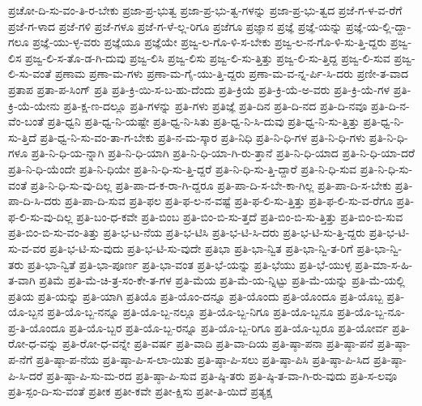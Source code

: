 {ಪ್ರಚೋ-ದಿ-ಸು-ವಂ-ತಿ-ರ-ಬೇಕು
ಪ್ರಜಾ-ಪ್ರ-ಭುತ್ವ
ಪ್ರಜಾ-ಪ್ರ-ಭು-ತ್ವ-ಗಳನ್ನು
ಪ್ರಜಾ-ಪ್ರ-ಭು-ತ್ವದ
ಪ್ರಜೆ-ಗ-ಳ-ವ-ರೆಗೆ
ಪ್ರಜೆ-ಗ-ಳಾದ
ಪ್ರಜೆ-ಗಳಿ
ಪ್ರಜೆ-ಗಳೂ
ಪ್ರಜೆ-ಗ-ಳೆ-ಲ್ಲ-ರಿಗೂ
ಪ್ರಜೆಗೂ
ಪ್ರಜ್ಞಾನ
ಪ್ರಜ್ಞೆ
ಪ್ರಜ್ಞೆ-ಯನ್ನು
ಪ್ರಜ್ಞೆ-ಯ-ಲ್ಲಿ-ದ್ದಾ-ಗಲೂ
ಪ್ರಜ್ಞೆ-ಯು-ಳ್ಳ-ವರು
ಪ್ರಜ್ಞೆಯೂ
ಪ್ರಜ್ಞೆಯೇ
ಪ್ರಜ್ವ-ಲ-ಗೊ-ಳಿ-ಸ-ಬೇಕು
ಪ್ರಜ್ವ-ಲ-ನ-ಗೊ-ಳಿ-ಸು-ತ್ತಿ-ದ್ದರು
ಪ್ರಜ್ವ-ಲಿಸ
ಪ್ರಜ್ವ-ಲಿ-ಸ-ತೊ-ಡ-ಗಿ-ದುವು
ಪ್ರಜ್ವ-ಲಿಸಿ
ಪ್ರಜ್ವ-ಲಿಸು
ಪ್ರಜ್ವ-ಲಿ-ಸು-ತ್ತಿತ್ತು
ಪ್ರಜ್ವ-ಲಿ-ಸು-ತ್ತಿದ್ದ
ಪ್ರಜ್ವ-ಲಿ-ಸುವ
ಪ್ರಜ್ವ-ಲಿ-ಸು-ವಂತೆ
ಪ್ರಣಾಮ
ಪ್ರಣಾ-ಮ-ಗಳು
ಪ್ರಣಾ-ಮ-ಗೈ-ಯು-ತ್ತಿ-ದ್ದರು
ಪ್ರಣಾ-ಮ-ವ-ನ್ನ-ರ್ಪಿ-ಸಿ-ದರು
ಪ್ರಣೀ-ತ-ವಾದ
ಪ್ರತಾಪ
ಪ್ರತಾ-ಪ-ಸಿಂಗ್
ಪ್ರತಿ
ಪ್ರತಿ-ಕ್ರಿ-ಯಿ-ಸ-ಬ-ಹು-ದೆಂದು
ಪ್ರತಿ-ಕ್ರಿಯೆ
ಪ್ರತಿ-ಕ್ರಿ-ಯೆ-ಅ-ವರು
ಪ್ರತಿ-ಕ್ರಿ-ಯೆ-ಗಳ
ಪ್ರತಿ-ಕ್ರಿ-ಯೆ-ಯೇನು
ಪ್ರತಿ-ಕ್ಷ-ಣ-ದಲ್ಲೂ
ಪ್ರತಿ-ಗಳನ್ನು
ಪ್ರತಿ-ಗಳು
ಪ್ರತಿಜ್ಞೆ
ಪ್ರತಿ-ದಿನ
ಪ್ರತಿ-ದಿ-ನದ
ಪ್ರತಿ-ದಿ-ನವೂ
ಪ್ರತಿ-ದಿ-ನ-ವೆಂ-ಬಂತೆ
ಪ್ರತಿ-ಧ್ವನಿ
ಪ್ರತಿ-ಧ್ವ-ನಿ-ಯಷ್ಟೇ
ಪ್ರತಿ-ಧ್ವ-ನಿ-ಸಿತು
ಪ್ರತಿ-ಧ್ವ-ನಿ-ಸಿ-ದುವು
ಪ್ರತಿ-ಧ್ವ-ನಿ-ಸು-ತ್ತಿತ್ತು
ಪ್ರತಿ-ಧ್ವ-ನಿ-ಸು-ತ್ತಿದೆ
ಪ್ರತಿ-ಧ್ವ-ನಿ-ಸು-ವಂ-ತಾ-ಗ-ಬೇಕು
ಪ್ರತಿ-ನ-ಮ-ಸ್ಕಾರ
ಪ್ರತಿ-ನಿಧಿ
ಪ್ರತಿ-ನಿ-ಧಿ-ಗಳ
ಪ್ರತಿ-ನಿ-ಧಿ-ಗಳು
ಪ್ರತಿ-ನಿ-ಧಿ-ಗಳೂ
ಪ್ರತಿ-ನಿ-ಧಿ-ಯ-ನ್ನಾಗಿ
ಪ್ರತಿ-ನಿ-ಧಿ-ಯಾಗಿ
ಪ್ರತಿ-ನಿ-ಧಿ-ಯಾ-ಗಿ-ರು-ತ್ತಾನೆ
ಪ್ರತಿ-ನಿ-ಧಿ-ಯಾದ
ಪ್ರತಿ-ನಿ-ಧಿ-ಯಾ-ದರೆ
ಪ್ರತಿ-ನಿ-ಧಿ-ಯೆಂದೇ
ಪ್ರತಿ-ನಿ-ಧಿಯೇ
ಪ್ರತಿ-ನಿ-ಧಿ-ಸು-ತ್ತಿ-ದ್ದರೆ
ಪ್ರತಿ-ನಿ-ಧಿ-ಸು-ತ್ತಿ-ದ್ದಾರೆ
ಪ್ರತಿ-ನಿ-ಧಿ-ಸುವ
ಪ್ರತಿ-ನಿ-ಧಿ-ಸು-ವಂತೆ
ಪ್ರತಿ-ನಿ-ಧಿ-ಸು-ವು-ದಿಲ್ಲ
ಪ್ರತಿ-ಪಾ-ದ-ಕ-ರಾ-ಗಿ-ದ್ದರೂ
ಪ್ರತಿ-ಪಾ-ದಿ-ಸ-ಬೇ-ಕಾ-ಗಿಲ್ಲ
ಪ್ರತಿ-ಪಾ-ದಿ-ಸ-ಬೇಕು
ಪ್ರತಿ-ಪಾ-ದಿ-ಸಿ-ದರು
ಪ್ರತಿ-ಪಾ-ದಿ-ಸುವ
ಪ್ರತಿ-ಫಲ
ಪ್ರತಿ-ಫ-ಲ-ನ-ವಷ್ಟೆ
ಪ್ರತಿ-ಫ-ಲಿ-ಸು-ತ್ತಿತ್ತು
ಪ್ರತಿ-ಫ-ಲಿ-ಸು-ವ-ರೆಗೂ
ಪ್ರತಿ-ಫ-ಲಿ-ಸು-ವು-ದಿಲ್ಲ
ಪ್ರತಿ-ಬಂ-ಧ-ಕವೇ
ಪ್ರತಿ-ಬಿಂಬ
ಪ್ರತಿ-ಬಿಂ-ಬಿ-ಸು-ತ್ತದೆ
ಪ್ರತಿ-ಬಿಂ-ಬಿ-ಸು-ತ್ತಿತ್ತು
ಪ್ರತಿ-ಬಿಂ-ಬಿ-ಸುವ
ಪ್ರತಿ-ಬಿಂ-ಬಿ-ಸು-ವಂ-ತಿತ್ತು
ಪ್ರತಿ-ಭ-ಟ-ನೆಯ
ಪ್ರತಿ-ಭ-ಟಿಸಿ
ಪ್ರತಿ-ಭ-ಟಿ-ಸಿ-ದರು
ಪ್ರತಿ-ಭ-ಟಿ-ಸು-ತ್ತಿ-ದ್ದರು
ಪ್ರತಿ-ಭ-ಟಿ-ಸು-ವ-ವರ
ಪ್ರತಿ-ಭ-ಟಿ-ಸು-ವುದು
ಪ್ರತಿ-ಭ-ಟಿ-ಸು-ವುದೇ
ಪ್ರತಿಭಾ
ಪ್ರತಿ-ಭಾ-ನ್ವಿತ
ಪ್ರತಿ-ಭಾ-ನ್ವಿ-ತ-ರಿಗೆ
ಪ್ರತಿ-ಭಾ-ನ್ವಿ-ತರು
ಪ್ರತಿ-ಭಾ-ನ್ವಿತೆ
ಪ್ರತಿ-ಭಾ-ಪೂರ್ಣ
ಪ್ರತಿ-ಭಾ-ವಂತ
ಪ್ರತಿ-ಭೆ-ಯನ್ನು
ಪ್ರತಿ-ಭೆಯು
ಪ್ರತಿ-ಭೆ-ಯುಳ್ಳ
ಪ್ರತಿ-ಮಾ-ಸ-ಹಿ-ತ-ವಾಗಿ
ಪ್ರತಿಮೆ
ಪ್ರತಿ-ಮೆ-ಚಿ-ತ್ರ-ಸಂ-ಕೇ-ತ-ಗಳ
ಪ್ರತಿ-ಮೆಯ
ಪ್ರತಿ-ಮೆ-ಯ-ನ್ನಿಟ್ಟು
ಪ್ರತಿ-ಮೆ-ಯನ್ನು
ಪ್ರತಿ-ಮೆ-ಯಲ್ಲಿ
ಪ್ರತಿಯ
ಪ್ರತಿ-ಯನ್ನು
ಪ್ರತಿ-ಯಾಗಿ
ಪ್ರತಿಯೊ
ಪ್ರತಿ-ಯೊಂ-ದನ್ನೂ
ಪ್ರತಿ-ಯೊಂದು
ಪ್ರತಿ-ಯೊಂದೂ
ಪ್ರತಿ-ಯೊಬ್ಬ
ಪ್ರತಿ-ಯೊ-ಬ್ಬನ
ಪ್ರತಿ-ಯೊ-ಬ್ಬ-ನನ್ನೂ
ಪ್ರತಿ-ಯೊ-ಬ್ಬ-ನಲ್ಲೂ
ಪ್ರತಿ-ಯೊ-ಬ್ಬ-ನಿಗೂ
ಪ್ರತಿ-ಯೊ-ಬ್ಬನೂ
ಪ್ರತಿ-ಯೊ-ಬ್ಬ-ನೂ-ಪ್ರ-ತಿ-ಯೊಂದೂ
ಪ್ರತಿ-ಯೊ-ಬ್ಬರ
ಪ್ರತಿ-ಯೊ-ಬ್ಬ-ರನ್ನೂ
ಪ್ರತಿ-ಯೊ-ಬ್ಬ-ರಿಗೂ
ಪ್ರತಿ-ಯೊ-ಬ್ಬರೂ
ಪ್ರತಿ-ಯೋರ್ವ
ಪ್ರತಿ-ರೋ-ಧ-ವನ್ನು
ಪ್ರತಿ-ರೋ-ಧ-ವನ್ನೇ
ಪ್ರತಿ-ವರ್ಷ
ಪ್ರತಿ-ವಾದಿ
ಪ್ರತಿ-ವಾ-ದಿಯ
ಪ್ರತಿ-ಷ್ಠಾ-ಪನಾ
ಪ್ರತಿ-ಷ್ಠಾ-ಪನೆ
ಪ್ರತಿ-ಷ್ಠಾ-ಪ-ನೆಗೆ
ಪ್ರತಿ-ಷ್ಠಾ-ಪ-ನೆಯ
ಪ್ರತಿ-ಷ್ಠಾ-ಪಿ-ಸ-ಲಾ-ಯಿತು
ಪ್ರತಿ-ಷ್ಠಾ-ಪಿ-ಸಲು
ಪ್ರತಿ-ಷ್ಠಾ-ಪಿಸಿ
ಪ್ರತಿ-ಷ್ಠಾ-ಪಿ-ಸಿದ
ಪ್ರತಿ-ಷ್ಠಾ-ಪಿ-ಸಿ-ದರೆ
ಪ್ರತಿ-ಷ್ಠಾ-ಪಿ-ಸು-ಮ-ರದ
ಪ್ರತಿ-ಷ್ಠಾ-ಪಿ-ಸುವ
ಪ್ರತಿ-ಷ್ಠಿ-ತರು
ಪ್ರತಿ-ಷ್ಠಿ-ತ-ವಾ-ಗಿ-ರು-ವುದು
ಪ್ರತಿ-ಸ-ಲವೂ
ಪ್ರತಿ-ಸ್ಪಂ-ದಿ-ಸು-ವಂತೆ
ಪ್ರತೀಕ
ಪ್ರತೀ-ಕವೇ
ಪ್ರತೀ-ಕ್ಷಿಸು
ಪ್ರತೀ-ತಿ-ಯಿದೆ
ಪ್ರತ್ಯಕ್ಷ
}
